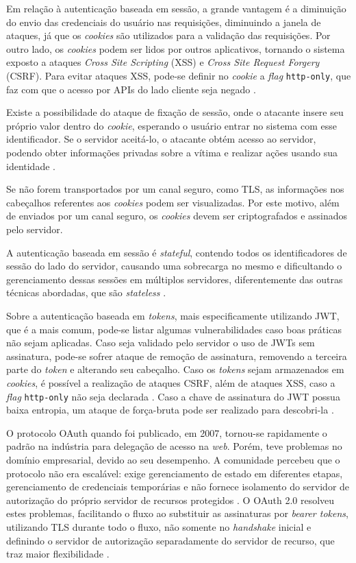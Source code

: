 Em relação à autenticação baseada em sessão, a grande vantagem é a diminuição do envio das 
credenciais do usuário nas requisições, diminuindo a janela de ataques, já que os \emph{cookies} 
são utilizados para a validação das requisições. Por outro lado, os \emph{cookies} podem ser lidos por 
outros aplicativos, tornando o sistema exposto a ataques \emph{Cross Site Scripting} (XSS) e 
\emph{Cross Site Request Forgery} (CSRF). Para evitar ataques XSS, pode-se definir no \emph{cookie} 
a \emph{flag} \texttt{http-only}, que faz com que o acesso por APIs do lado cliente seja negado 
\cite{PAPATHANASAKI2022}. 

Existe a possibilidade do ataque de fixação de sessão, onde o atacante insere seu próprio valor
dentro do \emph{cookie}, esperando o usuário entrar no sistema com esse identificador. Se o servidor
aceitá-lo, o atacante obtém acesso ao servidor, podendo obter informações privadas sobre a vítima
e realizar ações usando sua identidade \cite{DRHOVA2018}.

Se não forem transportados por um canal seguro, como TLS, as informações nos cabeçalhos referentes 
aos \emph{cookies} podem ser visualizadas. Por este motivo, além de enviados por um canal seguro, 
os \emph{cookies} devem ser criptografados e assinados pelo servidor\cite{RFC6265}.

A autenticação baseada em sessão é \emph{stateful}, contendo todos os identificadores de sessão do
lado do servidor, causando uma sobrecarga no mesmo e dificultando o gerenciamento dessas sessões em
múltiplos servidores, diferentemente das outras técnicas abordadas, que são \emph{stateless} 
\cite{BALAJ2017}.


Sobre a autenticação baseada em \emph{tokens}, mais especificamente utilizando JWT, que é a mais 
comum, pode-se listar algumas vulnerabilidades caso boas práticas não sejam aplicadas. Caso seja
validado pelo servidor o uso de JWTs sem assinatura, pode-se sofrer ataque de remoção de assinatura,
removendo a terceira parte do \emph{token} e alterando seu cabeçalho. Caso os \emph{tokens} sejam
armazenados em \emph{cookies}, é possível a realização de ataques CSRF, além de ataques XSS, caso a
\emph{flag} \texttt{http-only} não seja declarada \cite{PEYROTT2018}. Caso a chave de assinatura
do JWT possua baixa entropia, um ataque de força-bruta pode ser realizado para descobri-la 
\cite{RFC7515}.

O protocolo OAuth quando foi publicado, em 2007, tornou-se rapidamente o padrão na indústria para 
delegação de acesso na \emph{web}. Porém, teve problemas no domínio empresarial, devido ao seu desempenho. 
A comunidade percebeu que o protocolo não era escalável: exige gerenciamento de estado em diferentes 
etapas, gerenciamento de credenciais temporárias e não fornece isolamento do servidor de autorização 
do próprio servidor de recursos protegidos \cite{NOUREDDINE2011}. O OAuth 2.0 resolveu estes 
problemas, facilitando o fluxo ao substituir as assinaturas por \emph{bearer tokens}, utilizando TLS 
durante todo o fluxo, não somente no \emph{handshake} inicial e definindo o servidor de autorização 
separadamente do servidor de recurso, que traz maior flexibilidade \cite{SIRIWARDENA2014}.

